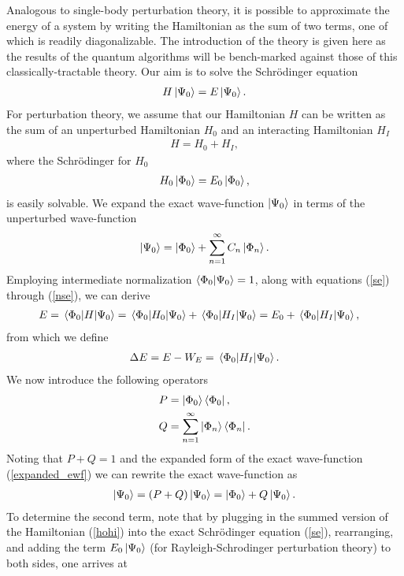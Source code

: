 \documentclass[10pt]{article}
\begin{document}
Analogous to single-body perturbation theory, it is possible to approximate the energy of a system by writing the Hamiltonian as the sum of two terms, one of which is readily diagonalizable. The introduction of the theory is given here as the results of the quantum algorithms will be bench-marked against those of this classically-tractable theory. Our aim is to solve the Schr\"{o}dinger equation
\begin{align}
\label{se}
H\ket{\Psi_0}=E\ket{\Psi_0}.
\end{align}
For perturbation theory, we assume that our Hamiltonian $H$ can be written as the sum of an unperturbed Hamiltonian $H_0$ and an interacting Hamiltonian $H_I$
\begin{align}
\label{hohi}
H=H_0+H_I,
\end{align}
where the Schr\"{o}dinger for $H_0$ 
\begin{align}
\label{nse}
H_0\ket{\Phi_0}=E_0\ket{\Phi_0},
\end{align}
is easily solvable.
We expand the exact wave-function $\ket{\Psi_0}$ in terms of the unperturbed wave-function
\begin{align}
\label{expanded_ewf}
\ket{\Psi_0}=\ket{\Phi_0}+\sum_{n=1}^\infty C_n\ket{\Phi_n}.
\end{align}
Employing intermediate normalization $\bra{\Phi_0}\ket{\Psi_0}=1$, along with equations (\ref{se}) through (\ref{nse}), we can derive
\begin{align}
E
&=
\mel{\Phi_0}{H}{\Psi_0}
=
\mel{\Phi_0}{H_0}{\Psi_0}+\mel{\Phi_0}{H_I}{\Psi_0}
=
E_0+\mel{\Phi_0}{H_I}{\Psi_0},
\end{align}
from which we define
\begin{align}
\label{delta_e}
\Delta E = E-W_E = \mel{\Phi_0}{H_I}{\Psi_0}.
\end{align}
We now introduce the following operators
\begin{align}
P
&=
\ket{\Phi_0}\bra{\Phi_0},
\\
Q 
&=
\sum_{n=1}^\infty \ket{\Phi_n}\bra{\Phi_n}.
\end{align}
Noting that $P+Q=1$ and the expanded form of the exact wave-function (\ref{expanded_ewf}) we can rewrite the exact wave-function as
\begin{align}
\label{pq_rw}
\ket{\Psi_0}=(P+Q)\ket{\Psi_0}=\ket{\Phi_0}+Q\ket{\Psi_0}.
\end{align}
To determine the second term, note that by plugging in the summed version of the Hamiltonian (\ref{hohi}) into the exact Schr\"{o}dinger equation (\ref{se}), rearranging, and adding the term $E_0\ket{\Psi_0}$ (for Rayleigh-Schrodinger perturbation theory) to both sides, one arrives at
\end{document}
